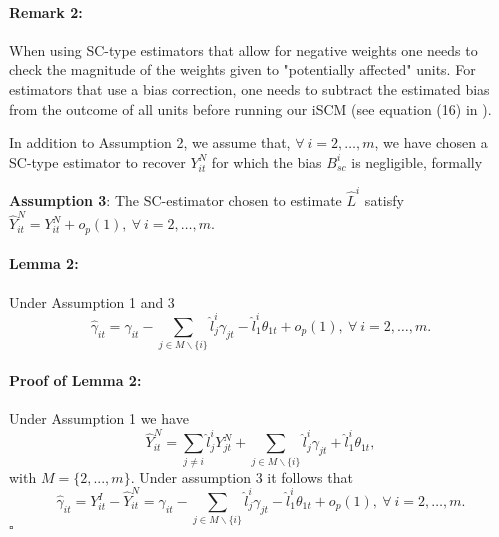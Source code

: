 \paragraph{Remark 2:} When using SC-type estimators that allow for negative weights one needs to check the magnitude of the weights given to "potentially affected" units. For estimators that use a bias correction, one needs to subtract the estimated bias from the outcome of all units before running our iSCM (see equation (16) in \citealt{Aba2020}).




In addition to Assumption 2, we assume that, $\forall \ i=2,\ldots,m$, we have chosen a SC-type estimator to recover $Y_{it}^N$ for which the bias $B_{sc}^i$ is negligible, formally 
\bigskip
\begin{center}
\textbf{Assumption 3}: The SC-estimator chosen to estimate $\widehat{L}^{i}$ satisfy $\widehat{Y}_{it}^N= Y_{it}^N + o_p(1), \ \forall \ i=2,\ldots,m.$
\end{center}
\bigskip


\paragraph{Lemma 2:} Under Assumption 1 and 3 
\begin{equation}
\widehat{\gamma}_{it}= \gamma_{it} - \sum_{j \in M \backslash \{{i} \}} \widehat{l}_{j}^{i}{\gamma_{jt}}- \widehat{l}_{1}^{i}{\theta_{1t}}+ o_p(1), \ \forall \ i=2,\ldots,m. \label{spill}
\end{equation}


\paragraph{Proof of Lemma 2:} Under Assumption 1 we have
\begin{equation}
\widehat{Y}_{it}^N=\sum_{j\neq i}  \widehat{l}^{i}_{j}Y_{jt}^N+ \sum_{j \in M \backslash \{{i} \}} \widehat{l}_{j}^{i}{\gamma_{jt}}+\widehat{l}^{i}_{1}{\theta_{1t}},
\end{equation}
with $M= \{2, ... , m\}$.
Under assumption 3 it follows that
$$
\widehat{\gamma}_{it}=Y_{it}^I-\widehat{Y}_{it}^N= \gamma_{it} - \sum_{j \in M \backslash \{{i} \}} \widehat{l}_{j}^{i}{\gamma_{jt}}- \widehat{l}_{1}^{i}{\theta_{1t}}+ o_p(1), \ \forall \ i=2,\ldots,m.
$$
$\square$


